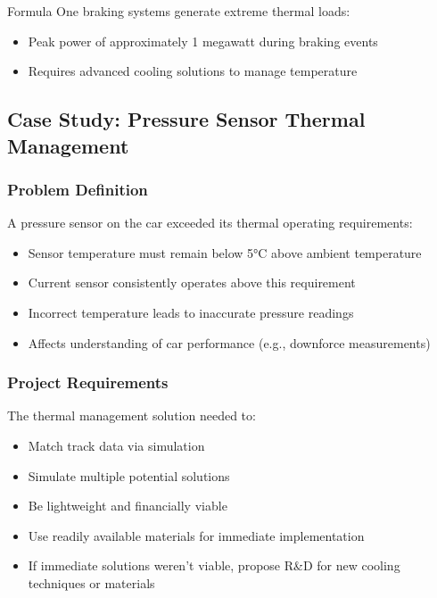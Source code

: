 Formula One braking systems generate extreme thermal loads:
\begin{itemize}
    \item Peak power of approximately 1 megawatt during braking events
    \item Requires advanced cooling solutions to manage temperature
\end{itemize}

\subsection*{Case Study: Pressure Sensor Thermal Management}

\subsubsection*{Problem Definition}

A pressure sensor on the car exceeded its thermal operating requirements:
\begin{itemize}
    \item Sensor temperature must remain below 5°C above ambient temperature
    \item Current sensor consistently operates above this requirement
    \item Incorrect temperature leads to inaccurate pressure readings
    \item Affects understanding of car performance (e.g., downforce measurements)
\end{itemize}

\subsubsection*{Project Requirements}

The thermal management solution needed to:
\begin{itemize}
    \item Match track data via simulation
    \item Simulate multiple potential solutions
    \item Be lightweight and financially viable
    \item Use readily available materials for immediate implementation
    \item If immediate solutions weren't viable, propose R\&D for new cooling techniques or materials
\end{itemize}

